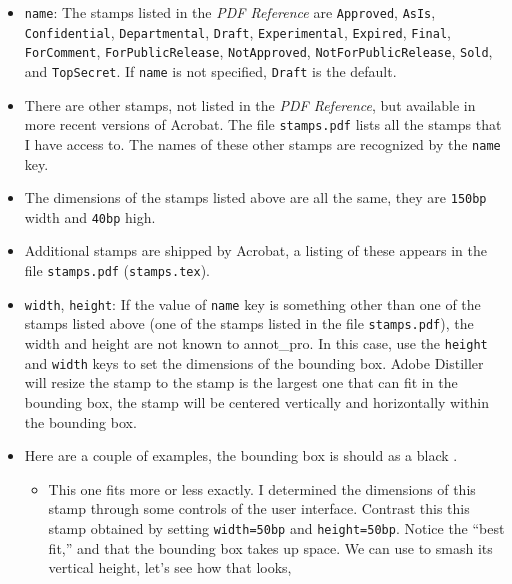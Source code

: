 \documentclass[12pt]{article}
\begin{document}
\begin{itemize}

\begingroup\raggedright

    \item \texttt{name}: The stamps listed in the \textsl{PDF
    Reference} are \texttt{Approved}, \texttt{AsIs},
    \texttt{Confidential}, \texttt{Departmental}, \texttt{Draft},
    \texttt{Experimental}, \texttt{Expired}, \texttt{Final},
    \texttt{ForComment}, \texttt{ForPublicRelease},
    \texttt{NotApproved}, \texttt{NotForPublicRelease},
    \texttt{Sold}, and \texttt{TopSecret}. If \texttt{name}
    is not specified, \texttt{Draft} is the default.\par\endgroup

    \item[] There are other stamps, not listed in the \textsl{PDF
    Reference}, but available in more recent versions of Acrobat.
    The file \texttt{stamps.pdf} lists all the stamps that I have
    access to. The names of these other stamps are recognized by the
    \texttt{name} key.

    \item[] The dimensions of the stamps listed above are all the
    same, they are \texttt{150bp} width and \texttt{40bp} high.

    \item[] Additional stamps are shipped by Acrobat, a listing of these
    appears in the file \texttt{stamps.pdf} (\texttt{stamps.tex}).

    \item\texttt{width}, \texttt{height}: If the value of
    \texttt{name} key is something other than one of the stamps
    listed above (one of the stamps listed in the file
    \texttt{stamps.pdf}), the width and height are not known to
    \textsf{annot\_pro}. In this case, use the \texttt{height} and \texttt{width} keys
    to set the dimensions of the bounding box. Adobe Distiller will
    resize the stamp to the stamp is the largest one that can fit in
    the bounding box, the stamp will be centered vertically and
    horizontally within the bounding box.

    \item[] Here are a couple of examples, the bounding box is should as a black .

\begin{itemize}

\previewtrue

        \item This one 
        fits more or less exactly.  I determined the dimensions of this stamp through some controls of the user interface.
        Contrast this this stamp
        obtained by setting \texttt{width=50bp} and \texttt{height=50bp}. Notice the ``best fit,'' and that the bounding
        box takes up space. We can use  to smash its vertical height, let's see how that looks,


\end{itemize}
\end{itemize}
\end{document}
